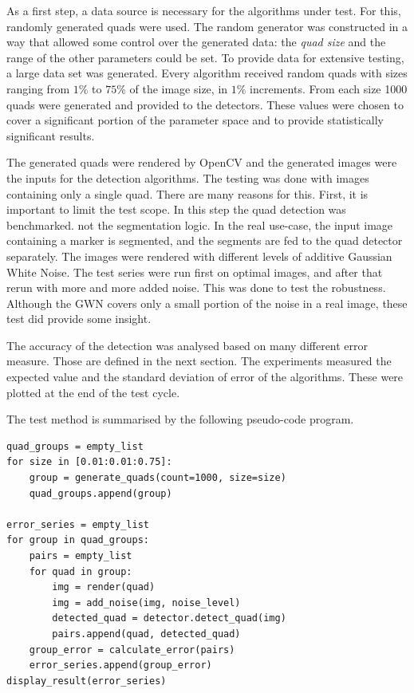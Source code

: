 As a first step, a data source is necessary for the algorithms under test.
For this, randomly generated quads were used.
The random generator was constructed in a way that allowed some control over the generated data: the \textit{quad size} and the range of the other parameters could be set.
To provide data for extensive testing, a large data set was generated.
Every algorithm received random quads with sizes ranging from $1\%$ to $75\%$ of the image size, in $1\%$ increments.
From each size 1000 quads were generated and provided to the detectors.
These values were chosen to cover a significant portion of the parameter space and to provide statistically significant results.

The generated quads were rendered by OpenCV and the generated images were the inputs for the detection algorithms.
The testing was done with images containing only a single quad.
There are many reasons for this.
First, it is important to limit the test scope.
In this step the quad detection was benchmarked. not the segmentation logic.
In the real use-case, the input image containing a marker is segmented, and the segments are fed to the quad detector separately.
The images were rendered with different levels of additive Gaussian White Noise.
The test series were run first on optimal images, and after that rerun with more and more added noise.
This was done to test the robustness.
Although the GWN covers only a small portion of the noise in a real image, these test did provide some insight.

The accuracy of the detection was analysed based on many different error measure.
Those are defined in the next section.
The experiments measured the expected value and the standard deviation of error of the algorithms.
These were plotted at the end of the test cycle.

The test method is summarised by the following pseudo-code program.
\begin{lstlisting}
quad_groups = empty_list
for size in [0.01:0.01:0.75]:
	group = generate_quads(count=1000, size=size)
	quad_groups.append(group)

error_series = empty_list
for group in quad_groups:
	pairs = empty_list
	for quad in group:
		img = render(quad)
		img = add_noise(img, noise_level)
		detected_quad = detector.detect_quad(img)
		pairs.append(quad, detected_quad)
	group_error = calculate_error(pairs)
	error_series.append(group_error)
display_result(error_series)	
\end{lstlisting}

